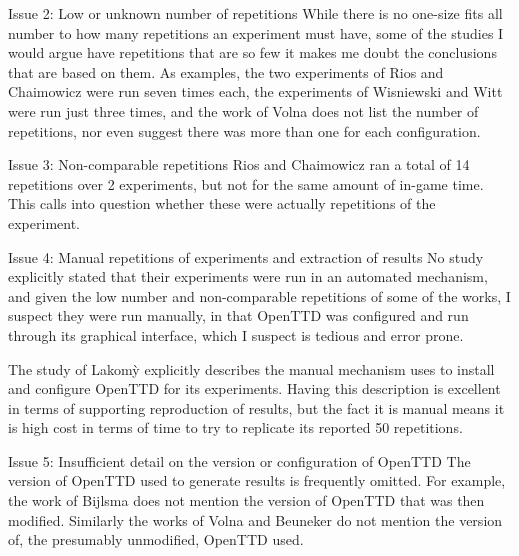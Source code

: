 \documentclass[logo,msc,dsti]{style/infthesis}    %
\begin{document}
{\begin{itemize}
\begin{descitem}{Issue 2: Low or unknown number of repetitions}
While there is no one-size fits all number to how many repetitions an experiment must have, some of the studies I would argue have repetitions that are so few it makes me doubt the conclusions that are based on them. As examples, the two experiments of Rios and Chaimowicz \cite{rios2009trains} were run seven times each, the experiments of Wisniewski and Witt \cite{wisniewski2011artificial} were run just three times, and the work of Volna \cite{volna2017fuzzy} does not list the number of repetitions, nor even suggest there was more than one for each configuration.
\end{descitem}
\begin{descitem}{Issue 3: Non-comparable repetitions}
Rios and Chaimowicz \cite{rios2009trains} ran a total of 14 repetitions over 2 experiments, but not for the same amount of in-game time. This calls into question whether these were actually repetitions of the experiment.
\end{descitem}
\begin{descitem}{Issue 4: Manual repetitions of experiments and extraction of results}
No study explicitly stated that their experiments were run in an automated mechanism, and given the low number and non-comparable repetitions of some of the works, I suspect they were run manually, in that OpenTTD was configured and run through its graphical interface, which I suspect is tedious and error prone.

The study of {Lakom{\`y}} \cite{lakomy2020railroad} explicitly describes the manual mechanism uses to install and configure OpenTTD for its experiments. Having this description is excellent in terms of supporting reproduction of results, but the fact it is manual means it is high cost in terms of time to try to replicate its reported 50 repetitions.
\end{descitem}

\begin{descitem}{Issue 5: Insufficient detail on the version or configuration of OpenTTD}
The version of OpenTTD used to generate results is frequently omitted. For example, the work of Bijlsma \cite{bijlsma2014evolving} does not mention the version of OpenTTD that was then modified. Similarly the works of Volna \cite{volna2017fuzzy} and Beuneker \cite{beuneker2019autonomous} do not mention the version of, the presumably unmodified, OpenTTD used.


\end{descitem}
\end{itemize}}
\end{document}
